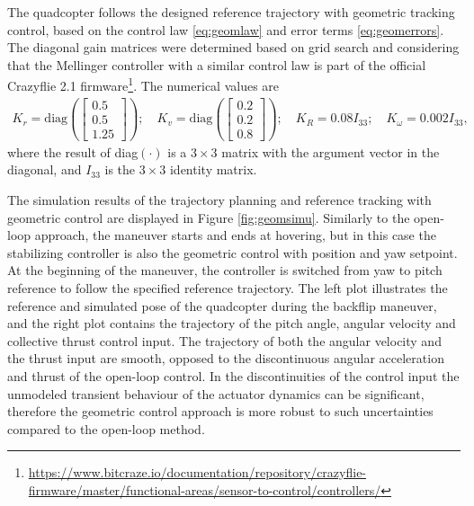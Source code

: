 The quadcopter follows the designed reference trajectory with geometric tracking control, based on the control law \eqref{eq:geomlaw} and error terms \eqref{eq:geomerrors}. The diagonal gain matrices were determined based on grid search and considering that the Mellinger controller \cite{mellinger2011} with a similar control law is part of the official Crazyflie 2.1 firmware\footnote{\url{https://www.bitcraze.io/documentation/repository/crazyflie-firmware/master/functional-areas/sensor-to-control/controllers/}}. The numerical values are
\begin{align*}
    K_r = \mathrm{diag}\left(\begin{bmatrix}
    0.5 \\ 0.5 \\ 1.25
    \end{bmatrix} \right);\quad K_v = \mathrm{diag}\left(\begin{bmatrix}
    0.2 \\ 0.2 \\ 0.8
    \end{bmatrix} \right);\quad K_R = 0.08 I_{33}; \quad K_\omega = 0.002 I_{33},
\end{align*}
 where the result of diag$(\cdot)$ is a $3\times 3$ matrix with the argument vector in the diagonal, and $I_{33}$ is the $3\times 3$ identity matrix.
 
 The simulation results of the trajectory planning and reference tracking with geometric control are displayed in Figure \ref{fig:geomsimu}. Similarly to the open-loop approach, the maneuver starts and ends at hovering, but in this case the stabilizing controller is also the geometric control with position and yaw setpoint. At the beginning of the maneuver, the controller is switched from yaw to pitch reference to follow the specified reference trajectory. The left plot illustrates the reference and simulated pose of the quadcopter during the backflip maneuver, and the right plot contains the trajectory of the pitch angle, angular velocity and collective thrust control input. The trajectory of both the angular velocity and the thrust input are smooth, opposed to the discontinuous angular acceleration and thrust of the open-loop control. In the discontinuities of the control input the unmodeled transient behaviour of the actuator dynamics can be significant, therefore the geometric control approach is more robust to such uncertainties compared to the open-loop method. 
 
